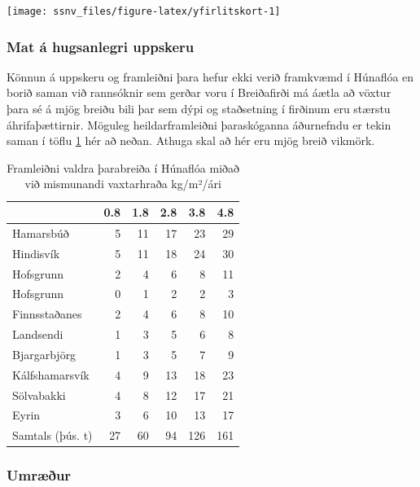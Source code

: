 \documentclass[icelandic,]{book}
\begin{document}
\begin{center}\texttt{[image: ssnv\_files/figure-latex/yfirlitskort-1]} \end{center}

\hypertarget{mat-a-hugsanlegri-uppskeru}{%
\subsubsection{Mat á hugsanlegri uppskeru}\label{mat-a-hugsanlegri-uppskeru}}

Könnun á uppskeru og framleiðni þara hefur ekki verið framkvæmd í Húnaflóa en borið saman við rannsóknir sem gerðar voru í Breiðafirði má áætla að vöxtur þara sé á mjög breiðu bili þar sem dýpi og staðsetning í firðinum eru stærstu áhrifaþættirnir. Möguleg heildarframleiðni þaraskóganna áðurnefndu er tekin saman í töflu \ref{tab:frml} hér að neðan. Athuga skal að hér eru mjög breið vikmörk.

\begin{table}[t]

\caption{\label{tab:frml}Framleiðni valdra þarabreiða í Húnaflóa miðað við mismunandi vaxtarhraða kg/m²/ári}
\centering
\begin{tabular}{lrrrrr}
\toprule
  & 0.8 & 1.8 & 2.8 & 3.8 & 4.8\\
\midrule
Hamarsbúð & 5 & 11 & 17 & 23 & 29\\
Hindisvík & 5 & 11 & 18 & 24 & 30\\
Hofsgrunn & 2 & 4 & 6 & 8 & 11\\
Hofsgrunn & 0 & 1 & 2 & 2 & 3\\
Finnsstaðanes & 2 & 4 & 6 & 8 & 10\\
\addlinespace
Landsendi & 1 & 3 & 5 & 6 & 8\\
Bjargarbjörg & 1 & 3 & 5 & 7 & 9\\
Kálfshamarsvík & 4 & 9 & 13 & 18 & 23\\
Sölvabakki & 4 & 8 & 12 & 17 & 21\\
Eyrin & 3 & 6 & 10 & 13 & 17\\
\addlinespace
Samtals (þús. t) & 27 & 60 & 94 & 126 & 161\\
\bottomrule
\end{tabular}
\end{table}

\hypertarget{umrur}{%
\subsubsection{Umræður}\label{umrur}}
\end{document}
